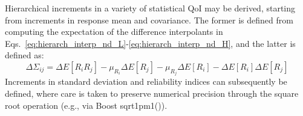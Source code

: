Hierarchical increments in a variety of statistical QoI may be derived,
starting from increments in response mean and covariance.  The former
is defined from computing the expectation of the difference interpolants
in Eqs.~\ref{eq:hierarch_interp_nd_L}-\ref{eq:hierarch_interp_nd_H}, and 
the latter is defined as:
\begin{equation}
\Delta \Sigma_{ij} = \Delta E[R_i R_j] - \mu_{R_i} \Delta E[R_j] - 
\mu_{R_j} \Delta E[R_i] - \Delta E[R_i] \Delta E[R_j]
\end{equation}
Increments in standard deviation and reliability indices can subsequently
be defined, where care is taken to preserve numerical precision through
the square root operation (e.g., via Boost sqrt1pm1()).

%

